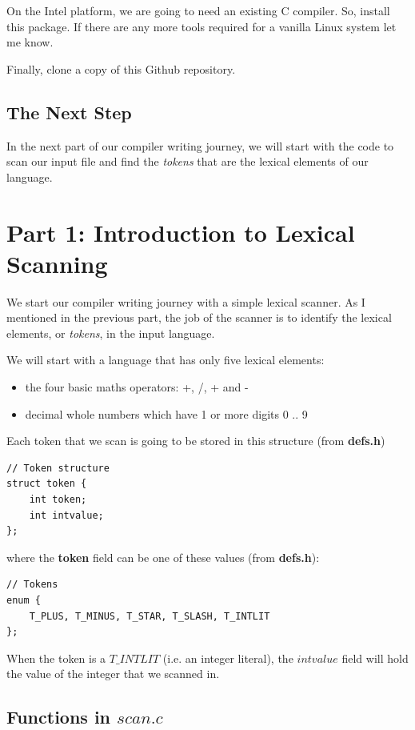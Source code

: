 \documentclass[journal, onecolumn, 12pt]{IEEEtran}
\begin{document}
On the Intel platform, we are going to need an existing C compiler. So, install this package.
If there are any more tools required for a vanilla Linux system let me know.

Finally, clone a copy of this Github repository.

\subsection{The Next Step}

In the next part of our compiler writing journey, we will start with the code to scan our input file and find the \textit{tokens} that are the lexical elements of our language.

\section{Part 1: Introduction to Lexical Scanning}

We start our compiler writing journey with a simple lexical scanner. As I mentioned in the previous part, the job of the scanner is to identify the lexical elements, or \textit{tokens}, in the input language.

We will start with a language that has only five lexical elements:
\begin{itemize}
    \item the four basic maths operators: {+}, {/}, {+} and {-}
    \item decimal whole numbers which have 1 or more digits 0 .. 9
\end{itemize}

Each token that we scan is going to be stored in this structure (from \textbf{defs.h})

\begin{lstlisting}
// Token structure
struct token {
    int token;
    int intvalue;
};
\end{lstlisting}

where the \textbf{token} field can be one of these values (from \textbf{defs.h}):

\begin{lstlisting}
// Tokens
enum {
    T_PLUS, T_MINUS, T_STAR, T_SLASH, T_INTLIT
};
\end{lstlisting}

When the token is a $T\_INTLIT$ (i.e. an integer literal), the $intvalue$ field will hold the value of the integer that we scanned in.

\subsection{Functions in $scan.c$}
\end{document}
